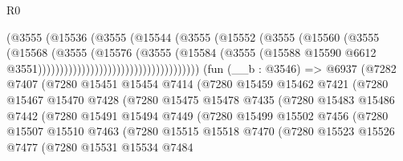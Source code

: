 \begin{lexlean}{R0}
\begin{coremodule}
                                              (@3555
                                                (@15536
                                                  (@3555
                                                    (@15544
                                                      (@3555
                                                        (@15552
                                                          (@3555
                                                            (@15560
                                                              (@3555
                                                                (@15568
                                                                  (@3555
                                                                    (@15576
                                                                      (@3555
                                                                        (@15584
                                                                          (@3555
                                                                            (@15588
                                                                              @15590
                                                                              @6612
                                                                              @3551)))))))))))))))))))))))))))))))))))))
    (fun (__b : @3546) =>
    @6937
      (@7282
        @7407
        (@7280
          @15451
          @15454
          @7414
          (@7280
            @15459
            @15462
            @7421
            (@7280
              @15467
              @15470
              @7428
              (@7280
                @15475
                @15478
                @7435
                (@7280
                  @15483
                  @15486
                  @7442
                  (@7280
                    @15491
                    @15494
                    @7449
                    (@7280
                      @15499
                      @15502
                      @7456
                      (@7280
                        @15507
                        @15510
                        @7463
                        (@7280
                          @15515
                          @15518
                          @7470
                          (@7280
                            @15523
                            @15526
                            @7477
                            (@7280
                              @15531
                              @15534
                              @7484

\end{coremodule}
\end{lexlean}
